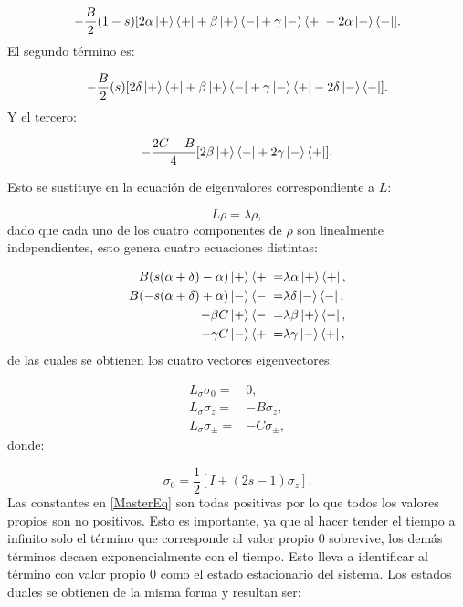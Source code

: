 \documentclass[a4paper,10pt]{report}
\begin{document}
\begin{equation}
-\frac{B}{2}(1-s)[2\alpha\Ket{+}\Bra{+}+\beta\Ket{+}\Bra{-}+\gamma\Ket{-}\Bra{+}-2\alpha\Ket{-}\Bra{-}].
\end{equation} El segundo término es:

\begin{equation}
-\frac{B}{2}(s)[2\delta\Ket{+}\Bra{+}+\beta\Ket{+}\Bra{-}+\gamma\Ket{-}\Bra{+}-2\delta\Ket{-}\Bra{-}].
\end{equation} Y el tercero:

\begin{equation}
-\frac{2C-B}{4}[2\beta\Ket{+}\Bra{-}+2\gamma\Ket{-}\Bra{+}].
\end{equation}

Esto se sustituye en la ecuación de eigenvalores correspondiente a $L$:

\begin{equation}
L\rho = \lambda\rho,
\end{equation} dado que cada uno de los cuatro componentes de $\rho$ son linealmente independientes, esto genera cuatro ecuaciones distintas:

\begin{align}
B(s(\alpha+\delta)-\alpha)\Ket{+}\Bra{+} =& \lambda\alpha\Ket{+}\Bra{+},\\
B(-s(\alpha+\delta)+\alpha)\Ket{-}\Bra{-} =& \lambda\delta\Ket{-}\Bra{-},\\
-\beta C \Ket{+}\Bra{-} =& \lambda \beta \Ket{+}\Bra{-}, \\
-\gamma C \Ket{-}\Bra{+} =& \lambda \gamma \Ket{-}\Bra{+},
\end{align}de las cuales se obtienen los cuatro vectores eigenvectores:

\begin{align}
L_\sigma \sigma_0 =& 0, \\
L_\sigma \sigma_z =& -B \sigma_z, \\
L_\sigma \sigma_\pm =& -C \sigma_\pm,
\end{align} donde:

\begin{equation}
\sigma_0 = \frac{1}{2}[I + (2s-1)\sigma_z].
\end{equation} Las constantes en \eqref{MasterEq} son todas positivas por lo que todos los valores propios son no positivos. Esto es importante, ya que al hacer tender el tiempo a infinito solo el término que corresponde al valor propio 0 sobrevive, los demás términos decaen exponencialmente con el tiempo. Esto lleva a identificar al término con valor propio 0 como el estado estacionario del sistema. Los estados duales se obtienen de la misma forma y resultan ser\cite{EnglertDB}:
\end{document}
